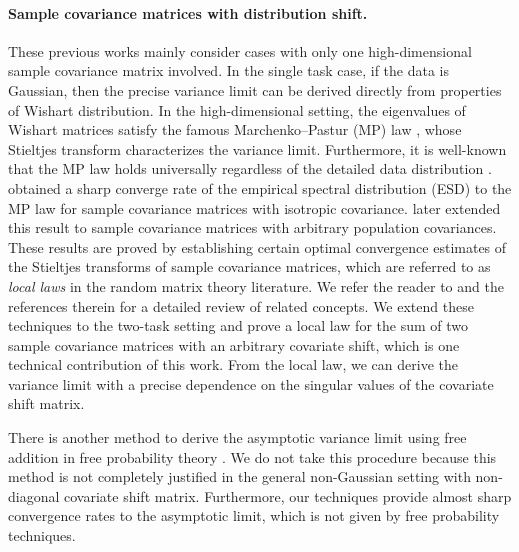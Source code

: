 \paragraph{Sample covariance matrices with distribution shift.}
These previous works mainly consider cases with only one high-dimensional sample covariance matrix involved. %
In the single task case, if the data is Gaussian, then the precise variance limit can be derived directly from properties of Wishart distribution. In the high-dimensional setting, the eigenvalues of Wishart matrices satisfy the famous Marchenko–Pastur (MP) law \cite{MP}, whose Stieltjes transform characterizes the variance limit. Furthermore, it is well-known that the MP law holds universally regardless of the detailed data distribution \cite{bai2010spectral}. \cite{isotropic} obtained a sharp converge rate of the empirical spectral distribution (ESD) to the MP law for sample covariance matrices with isotropic covariance. \cite{Anisotropic,DY} later extended this result to sample covariance matrices with arbitrary population covariances. These results are proved by establishing certain optimal convergence estimates of the Stieltjes transforms of sample covariance matrices, which are referred to as \emph{local laws} in the random matrix theory literature. We refer the reader to \cite{erdos2017dynamical} and the references therein for a detailed review of related concepts. We extend these techniques to the two-task setting and prove a local law for the sum of two sample covariance matrices with an arbitrary covariate shift, which is one technical contribution of this work. From the local law, we can derive the variance limit with a precise dependence on the singular values of the covariate shift matrix. 




There is another method to derive the asymptotic variance limit using free addition in free probability theory \cite{nica2006lectures}. We do not take this procedure because this method is not completely justified in the general non-Gaussian setting with non-diagonal covariate shift matrix. 
Furthermore, our techniques provide almost sharp convergence rates to the asymptotic limit, which is not given by free probability techniques. 

